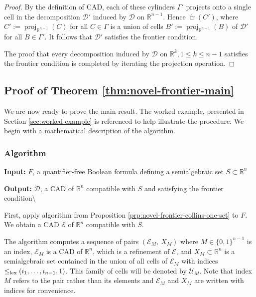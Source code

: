 \documentclass[
]{book}
\theoremstyle{definition}
\theoremstyle{definition}
\theoremstyle{definition}
\theoremstyle{definition}
\theoremstyle{remark}
\begin{document}
\begin{proof}
By the definition of CAD, each of these cylinders \(\Gamma'\) projects onto a single cell in the decomposition \(\mathcal{D'}\) induced by \(\mathcal{D}\) on \(\mathbb{R}^{n-1}\). Hence \({\operatorname{fr} \left( C' \right)}\), where \(C' := \operatorname{proj}_{\mathbb{R}^{n-1}}(C)\) for all \(C \in \Gamma\) is a union of cells \(B' := \operatorname{proj}_{\mathbb{R}^{n-1}}(B)\) of \(\mathcal{D'}\) for all \(B \in \Gamma'\).
It follows that \(\mathcal{D'}\) satisfies the frontier condition.

The proof that every decomposition induced by \(\mathcal{D}\) on \(\mathbb{R}^{k}, 1 \le k \le n-1\) satisfies the frontier condition is completed by iterating the projection operation.
\end{proof}

\hypertarget{proof-of-theorem-refthmnovel-frontier-main}{%
\subsection{Proof of Theorem \ref{thm:novel-frontier-main}}\label{proof-of-theorem-refthmnovel-frontier-main}}

We are now ready to prove the main result. The worked example, presented in Section \ref{sec:worked-example} is referenced to help illustrate the procedure.
We begin with a mathematical description of the algorithm.

\hypertarget{algorithm}{%
\subsubsection{Algorithm}\label{algorithm}}

\textbf{Input:} \(F\), a quantifier-free Boolean formula defining a semialgebraic set \(S \subset \mathbb{R}^n\)

\textbf{Output:} \(\mathcal{D}\), a CAD of \(\mathbb{R}^n\) compatible with \(S\) and satisfying the frontier condition\textbackslash{}

First, apply algorithm from Proposition \ref{prp:novel-frontier-collins-one-set} to \(F\). We obtain a CAD \(\mathcal E\) of \(\mathbb{R}^n\)
compatible with \(S\).

The algorithm computes a sequence of pairs \(({\mathcal E}_M,\ X_M)\) where \(M \in \{0,1\}^{n-1}\) is an index, \(\mathcal{E}_M\) is a CAD of \(\mathbb{R}^n\), which is a refinement of \(\mathcal{E}\), and \(X_M \subset \mathbb{R}^n\) is a semialgebraic set contained in the union of all cells of \({\mathcal E}_M\) with indices \(\le_{\rm{lex}}(i_1,\ldots,i_{n-1},1)\). This family of cells will be denoted by \(\mathcal{U}_M\). Note that index \(M\) refers to the pair rather than its elements and \(\mathcal{E}_M\) and \(X_M\) are written with indices for convenience.
\end{document}
